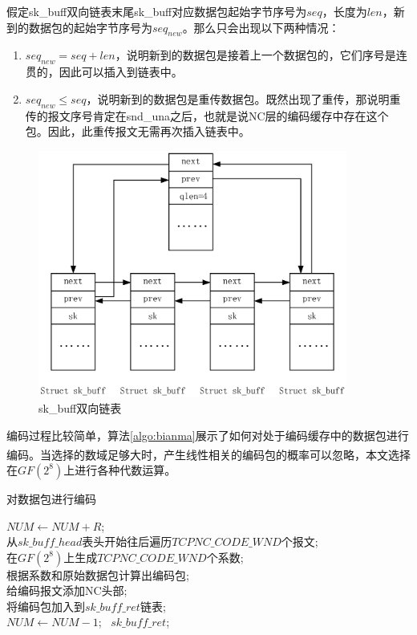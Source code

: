 \par
假定sk\_buff双向链表末尾sk\_buff对应数据包起始字节序号为$seq$，长度为$len$，新到的数据包的起始字节序号为$seq_{new}$。那么只会出现以下两种情况：
\begin{enumerate}[fullwidth,itemindent=2em,label=(\arabic*)]
	\item $seq_{new}=seq+len$，说明新到的数据包是接着上一个数据包的，它们序号是连贯的，因此可以插入到链表中。
	\item $seq_{new} \le seq$，说明新到的数据包是重传数据包。既然出现了重传，那说明重传的报文序号肯定在snd\_una之后，也就是说NC层的编码缓存中存在这个包。因此，此重传报文无需再次插入链表中。
\end{enumerate}
\begin{figure}[htbp]
	\centering
	\includegraphics[width=4in]{figures/skbufflink.eps}
	\caption{sk\_buff双向链表}
	\label{SKBUFFLINK_EPS}
\end{figure}
\par
编码过程比较简单，算法\ref{algo:bianma}展示了如何对处于编码缓存中的数据包进行编码。当选择的数域足够大时，产生线性相关的编码包的概率可以忽略\textsuperscript{\cite{fragouli2006network}}，本文选择在$GF\left(2^8\right)$上进行各种代数运算。
\renewcommand{\algorithmcfname}{算法}
\begin{algorithm}
	\caption{对数据包进行编码} 
	\label{algo:bianma}
	$NUM \leftarrow NUM+R$;\\
	{  
		从$sk\_buff\_head$表头开始往后遍历$TCPNC\_CODE\_WND$个报文;\\
		在$GF\left(2^8\right)$上生成$TCPNC\_CODE\_WND$个系数;\\
		根据系数和原始数据包计算出编码包;\\
		给编码报文添加NC头部;\\
		将编码包加入到$sk\_buff\_ret$链表;\\
		$NUM \leftarrow NUM-1$;
	}
	\Return \ $sk\_buff\_ret$;
\end{algorithm}
